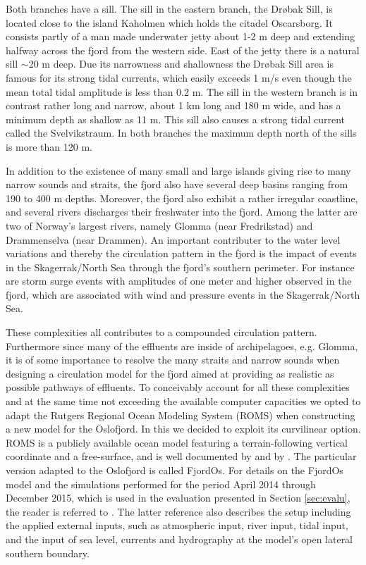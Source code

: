 Both branches have a sill. The sill in the eastern branch, the Dr{\o}bak Sill, is located close to the island Kaholmen which holds the citadel Oscarsborg. It consists partly of a man made underwater jetty about 1-2 m deep and extending halfway across the fjord from the western side. East of the jetty there is a natural sill $\sim$20 m deep. Due its narrowness and shallowness the Dr{\o}bak Sill area is famous for its strong tidal currents, which easily exceeds 1 m/s even though the mean total tidal amplitude is less than 0.2 m. The sill in the western branch is in contrast rather long and narrow, about 1 km long and 180 m wide, and has a minimum depth as shallow as 11 m. This sill also causes a strong tidal current called the Svelvikstraum. In both branches the maximum depth north of the sills is more than 120 m. 

In addition to the existence of many small and large islands giving rise to many narrow sounds and straits, the fjord also have several deep basins ranging from 190 to 400 m depths. Moreover, the fjord also exhibit a rather irregular coastline, and several rivers discharges their freshwater into the fjord. Among the latter are two of Norway's largest rivers, namely Glomma (near Fredrikstad) and Drammenselva (near Drammen). An important contributer to the water level variations and thereby the circulation pattern in the fjord is the impact of events in the Skagerrak/North Sea through the fjord's southern perimeter. For instance are storm surge events with amplitudes of one meter and higher observed in the fjord, which are associated with wind and pressure events in the Skagerrak/North Sea.

These complexities all contributes to a compounded circulation pattern. Furthermore since many of the effluents are inside of archipelagoes, e.g. Glomma, it is of some importance to resolve the many straits and narrow sounds when designing a circulation model for the fjord aimed at providing as realistic as possible pathways of effluents. To conceivably account for all these complexities and at the same time not exceeding the available computer capacities we opted to adapt the Rutgers Regional Ocean Modeling System (ROMS) when constructing a new model for the Oslofjord. In this we decided to exploit its curvilinear option. ROMS is a publicly available ocean model featuring a terrain-following vertical coordinate and a free-surface, and is well documented by \cite{haidv:etal:2008} and by \cite{shche:mcwil:2003,shche:mcwil:2005,shche:mcwil:2009}. The particular version adapted to the Oslofjord is called FjordOs. For details on the FjordOs model and the simulations performed for the period April 2014 through December 2015, which is used in the evaluation presented in Section \ref{sec:evalu}, the reader is referred to \cite{roed:etal:2016}. The latter reference also describes the setup including the applied external inputs, such as atmospheric input, river input, tidal input, and the input of sea level, currents and hydrography at the model's open lateral southern boundary.

